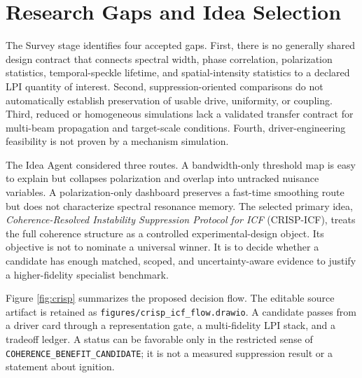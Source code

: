 \documentclass[conference]{../../../../Conference-LaTeX-template_10-17-19/IEEEtran}
\begin{document}
\section{Research Gaps and Idea Selection}
The Survey stage identifies four accepted gaps. First, there is no generally shared design contract that connects spectral width, phase correlation, polarization statistics, temporal-speckle lifetime, and spatial-intensity statistics to a declared LPI quantity of interest. Second, suppression-oriented comparisons do not automatically establish preservation of usable drive, uniformity, or coupling. Third, reduced or homogeneous simulations lack a validated transfer contract for multi-beam propagation and target-scale conditions. Fourth, driver-engineering feasibility is not proven by a mechanism simulation.

The Idea Agent considered three routes. A bandwidth-only threshold map is easy to explain but collapses polarization and overlap into untracked nuisance variables. A polarization-only dashboard preserves a fast-time smoothing route but does not characterize spectral resonance memory. The selected primary idea, \emph{Coherence-Resolved Instability Suppression Protocol for ICF} (CRISP-ICF), treats the full coherence structure as a controlled experimental-design object. Its objective is not to nominate a universal winner. It is to decide whether a candidate has enough matched, scoped, and uncertainty-aware evidence to justify a higher-fidelity specialist benchmark.

Figure \ref{fig:crisp} summarizes the proposed decision flow. The editable source artifact is retained as \texttt{figures/crisp\_icf\_flow.drawio}. A candidate passes from a driver card through a representation gate, a multi-fidelity LPI stack, and a tradeoff ledger. A status can be favorable only in the restricted sense of \texttt{COHERENCE\_BENEFIT\_CANDIDATE}; it is not a measured suppression result or a statement about ignition.
\end{document}
